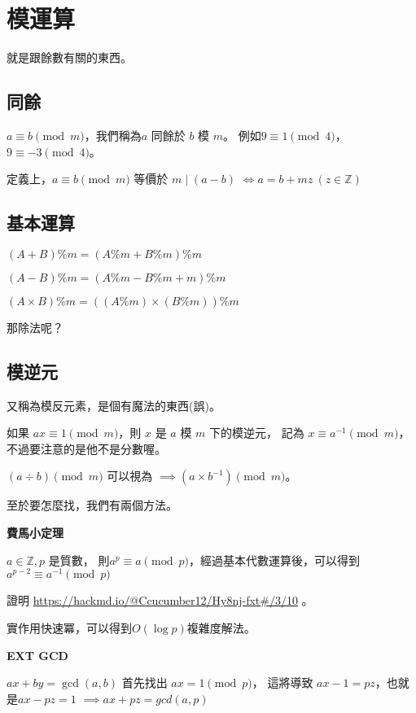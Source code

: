 \section{模運算}
    就是跟餘數有關的東西。

    \subsection{同餘}
    $a \equiv b \pmod m$，我們稱為$a$ 同餘於 $b$ 模 $m$。
    例如$9 \equiv 1 \pmod 4$，$9 \equiv -3 \pmod 4$。

    定義上，$a \equiv b \pmod m$ 等價於 $m \mid (a - b)$
    $\Leftrightarrow  a = b + mz\ (z \in \mathbb{Z})$

    \subsection{基本運算}

    $(A + B) \% m = (A \% m + B \% m) \% m$

    $(A - B) \% m = (A \% m - B \% m + m) \% m$

    $(A \times B) \% m = ((A \% m) \times (B \% m)) \% m$

    那除法呢？

    \subsection{模逆元}

    又稱為模反元素，是個有魔法的東西(誤)。

    如果 $ax \equiv 1 \pmod m$，則 $x$ 是 $a$ 模 $m$ 下的模逆元，
    記為 $x \equiv a^{-1} \pmod m$，不過要注意的是他不是分數喔。

    $(a \div b) \pmod m$ 可以視為 $\implies (a \times b^{-1}) \pmod m$。

    至於要怎麼找，我們有兩個方法。

    \textbf{費馬小定理}

    $a \in \mathbb{Z}, p$ 是質數，
    則$a^p \equiv a \pmod p$，經過基本代數運算後，可以得到
    $a^{p-2} \equiv a^{-1} \pmod p$

    證明 \url{https://hackmd.io/@Ccucumber12/Hy8nj-fxt#/3/10} 。

    實作用快速冪，可以得到$O(\log p)$複雜度解法。

    \textbf{EXT GCD}

    $ax + by = \gcd(a,b)$ 首先找出 $ax = 1 \pmod p$，
    這將導致 $ax - 1 = pz$，也就是$ax - pz = 1$
    $\implies ax + pz = gcd(a,p)$